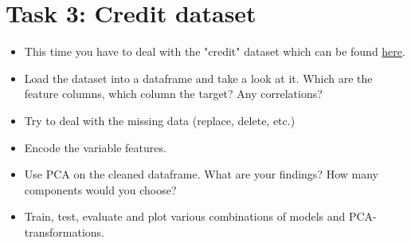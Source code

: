 \documentclass{article}
\begin{document}
\section*{Task 3: Credit dataset}
\begin{itemize}
    \item This time you have to deal with the "credit" dataset which can be found \href{https://github.com/DataScienceLabFHSWF/MachineLearningCourse/tree/main/data/05}{here}. 
    \item Load the dataset into a dataframe and take a look at it. Which are the feature columns, which column the target? Any correlations?
    \item Try to deal with the missing data (replace, delete, etc.)
    \item Encode the variable features.
    \item Use PCA on the cleaned dataframe. What are your findings? How many components would you choose?
    \item Train, test, evaluate and plot various combinations of models and PCA-transformations.
\end{itemize}

%
%
\end{document}
